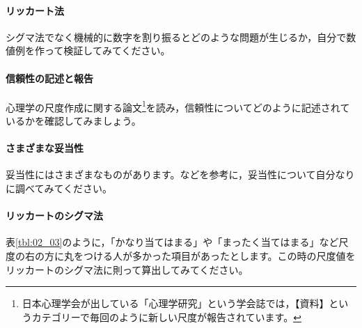 \documentclass{ltjsbook}
\begin{document}
\paragraph{リッカート法}シグマ法でなく機械的に数字を割り振るとどのような問題が生じるか，自分で数値例を作って検証してみてください。
\paragraph{信頼性の記述と報告}心理学の尺度作成に関する論文\footnote{日本心理学会が出している「心理学研究」という学会誌では，【資料】というカテゴリーで毎回のように新しい尺度が報告されています。}を読み，信頼性についてどのように記述されているかを確認してみましょう。
\paragraph{さまざまな妥当性}妥当性にはさまざまなものがあります。\textcite{kosugi2016b}などを参考に，妥当性について自分なりに調べてみてください。
\paragraph{リッカートのシグマ法} 表\ref{tbl:02_03}のように，「かなり当てはまる」や「まったく当てはまる」など尺度の右の方に丸をつける人が多かった項目があったとします。この時の尺度値をリッカートのシグマ法に則って算出してみてください。
\end{document}
